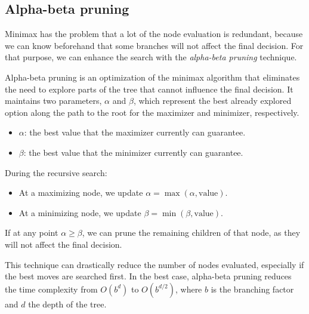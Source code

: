 \vspace{1em}

\subsection*{Alpha-beta pruning}\label{sec:alphaBeta}

Minimax has the problem that a lot of the node evaluation is redundant, because we can know beforehand that some branches will not affect the final decision. For that purpose, we can enhance the search with the \textit{alpha-beta pruning} technique. 

\vspace{1em}

\noindent Alpha-beta pruning is an optimization of the minimax algorithm that eliminates the need to explore parts of the tree that cannot influence the final decision. It maintains two parameters, \(\alpha\) and \(\beta\), which represent the best already explored option along the path to the root for the maximizer and minimizer, respectively.

\begin{itemize}
    \item \(\alpha\): the best value that the maximizer currently can guarantee.
    \item \(\beta\): the best value that the minimizer currently can guarantee.
\end{itemize}

During the recursive search:
\begin{itemize}
    \item At a maximizing node, we update \(\alpha = \operatorname{max}(\alpha, \text{value})\).
    \item At a minimizing node, we update \(\beta = \operatorname{min}(\beta, \text{value})\).
\end{itemize}

If at any point \(\alpha \geq \beta\), we can prune the remaining children of that node, as they will not affect the final decision.

\vspace{1em}

This technique can drastically reduce the number of nodes evaluated, especially if the best moves are searched first. In the best case, alpha-beta pruning reduces the time complexity from \(O(b^d)\) to \(O(b^{d/2})\), where \(b\) is the branching factor and \(d\) the depth of the tree.

\vspace{1em}

